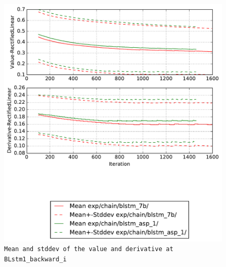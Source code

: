 \documentclass[prl,10pt,twocolumn]{revtex4}
\begin{document}
\newpage
\begin{figure}[h]
  \begin{center}
    \caption{\texttt{Mean and stddev of the value and derivative at BLstm1\_backward\_i}}
    \includegraphics[width=\textwidth]{exp/chain/blstm_7b/report/nonlinstats_BLstm1_backward_i.pdf}
  \end{center}
\end{figure}
\clearpage
\end{document}
